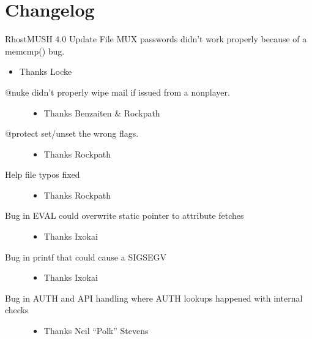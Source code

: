 \documentclass[letterpaper,10pt,english]{sphinxmanual}
\begin{document}
\section{Changelog}
\label{\detokenize{changelog:changelog}}\label{\detokenize{changelog::doc}}
\sphinxAtStartPar
RhostMUSH 4.0 Update File
MUX passwords didn’t work properly because of a memcmp() bug.
\begin{itemize}
\item {} 
\sphinxAtStartPar
Thanks Locke

\end{itemize}
\begin{description}
\item[{@nuke didn’t properly wipe mail if issued from a non\sphinxhyphen{}player.}] \leavevmode\begin{itemize}
\item {} 
\sphinxAtStartPar
Thanks Benzaiten \& Rockpath

\end{itemize}

\item[{@protect set/unset the wrong flags.}] \leavevmode\begin{itemize}
\item {} 
\sphinxAtStartPar
Thanks Rockpath

\end{itemize}

\item[{Help file typos fixed}] \leavevmode\begin{itemize}
\item {} 
\sphinxAtStartPar
Thanks Rockpath

\end{itemize}

\item[{Bug in EVAL could overwrite static pointer to attribute fetches}] \leavevmode\begin{itemize}
\item {} 
\sphinxAtStartPar
Thanks Ixokai

\end{itemize}

\item[{Bug in printf that could cause a SIGSEGV}] \leavevmode\begin{itemize}
\item {} 
\sphinxAtStartPar
Thanks Ixokai

\end{itemize}

\item[{Bug in AUTH and API handling where AUTH lookups happened with internal checks}] \leavevmode\begin{itemize}
\item {} 
\sphinxAtStartPar
Thanks Neil “Polk” Stevens


\end{itemize}
\end{description}
\end{document}
